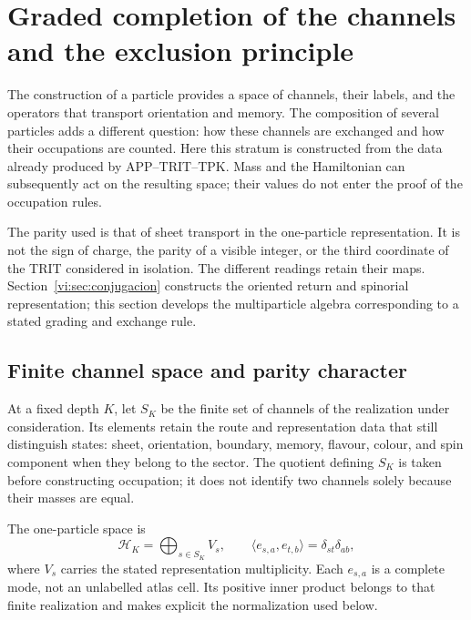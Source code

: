 \section{Graded completion of the channels and the exclusion principle}
\label{vi:sec:fock-pauli}

The construction of a particle provides a space of channels, their labels,
and the operators that transport orientation and memory. The composition
of several particles adds a different question: how these channels are
exchanged and how their occupations are counted. Here this stratum is
constructed from the data already produced by APP--TRIT--TPK. Mass and the
Hamiltonian can subsequently act on the resulting space; their values
do not enter the proof of the occupation rules.

The parity used is that of sheet transport in the one-particle representation.
It is not the sign of charge, the parity of a visible integer, or the third
coordinate of the TRIT considered in isolation. The different readings
retain their maps. Section~\ref{vi:sec:conjugacion} constructs the oriented
return and spinorial representation; this section develops the
multiparticle algebra corresponding to a stated grading and exchange rule.

\subsection{Finite channel space and parity character}
\label{vi:subsec:canales-graduados}

At a fixed depth \(K\), let \(S_K\) be the finite set of
channels of the realization under consideration. Its elements retain the
route and representation data that still distinguish states:
sheet, orientation, boundary, memory, flavour, colour, and spin component
when they belong to the sector. The quotient defining \(S_K\)
is taken before constructing occupation; it does not identify two channels
solely because their masses are equal.

The one-particle space is
\begin{equation}
 \mathcal H_K=\bigoplus_{s\in S_K}V_s,
 \qquad\langle e_{s,a},e_{t,b}\rangle=\delta_{st}\delta_{ab},
 \label{vi:eq:espacio-canales-fock}
\end{equation}
where \(V_s\) carries the stated representation multiplicity.
Each \(e_{s,a}\) is a complete mode, not an unlabelled atlas cell.
Its positive inner product belongs to that finite realization and makes
explicit the normalization used below.

